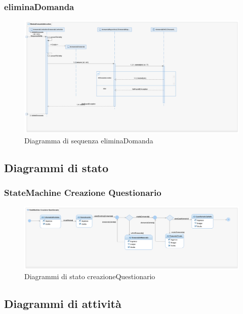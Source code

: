 \documentclass[12pt]{article}
\begin{document}
\subsubsection{eliminaDomanda}
\begin{figure}[H]
\centering
\includegraphics[scale=0.40]{UNIMIBModule_EliminaDomandaSequenceDiagram.png}
\caption{Diagramma di sequenza eliminaDomanda}
\end{figure}
\subsection{Diagrammi di stato}
\subsubsection{StateMachine Creazione Questionario}
\begin{figure}[H]
\centering
\includegraphics[scale=0.40]{UNIMIBModule_StatemachineDiagramCreazioneQuestionario.png}
\caption{Diagrammi di stato creazioneQuestionario}
\end{figure}
\subsection{Diagrammi di attivit\`{a}}
\end{document}
